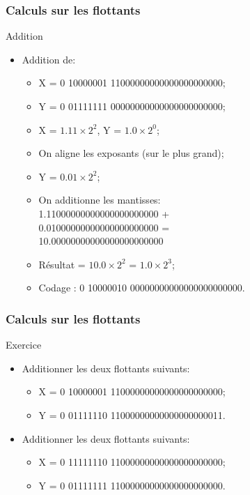 \documentclass{beamer}
\begin{document}
\begin{frame}
	\frametitle{Calculs sur les flottants}
	
	\begin{block}{Addition}
		\begin{itemize}
			\item Addition de:
			\begin{itemize}
				\item X = 0 10000001 11000000000000000000000;
				\item Y = 0 01111111 00000000000000000000000;
				\item X = $1.11\times{}2^2$, Y = $1.0\times{}2^0$;
				\item On aligne les exposants (sur le plus grand);
				\item Y = $0.01\times{}2^2$;
				\item On additionne les mantisses:\\
				1.11000000000000000000000 +\\
				0.01000000000000000000000 =\\
				10.00000000000000000000000
				\item Résultat = $10.0\times{}2^2$ = $1.0\times{}2^3$;
				\item Codage : 0 10000010 00000000000000000000000.
			\end{itemize}
		\end{itemize}
	\end{block}
\end{frame}

\begin{frame}
	\frametitle{Calculs sur les flottants}
	
	\begin{block}{Exercice}
		\begin{itemize}
			\item Additionner les deux flottants suivants:
			\begin{itemize}
				\item X = 0 10000001 11000000000000000000000;
				\item Y = 0 01111110 11000000000000000000011.
			\end{itemize}
			
			\item Additionner les deux flottants suivants:
			\begin{itemize}
				\item X = 0 11111110 11000000000000000000000;
				\item Y = 0 01111111 11000000000000000000000.
			\end{itemize}
		\end{itemize}
	\end{block}
\end{frame}
\end{document}
